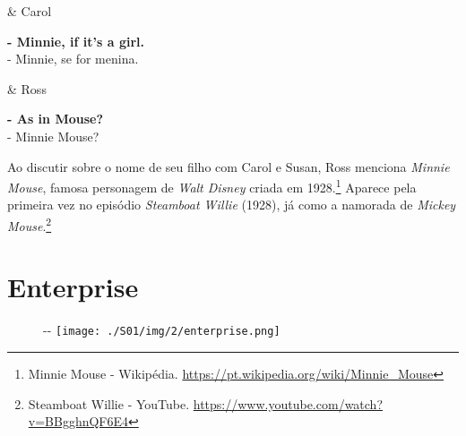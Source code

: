\begin{tcolorbox}[enhanced,center upper,
    drop fuzzy shadow southeast, boxrule=0.3pt,
    lower separated=false, breakable,
    colframe=black!30!dialogoBorder,colback=white]
\begin{minipage}[c]{0.16\linewidth}
   & \centering \scriptsize{Carol}
\end{minipage}
\hfill
\begin{minipage}[c]{0.8\linewidth}
  \textbf{- Minnie, if it's a girl.}\\
  - Minnie, se for menina.
\end{minipage}

\medskip
\begin{minipage}[c]{0.16\linewidth}
   & \centering \scriptsize{Ross}
\end{minipage}
\hfill
\begin{minipage}[c]{0.8\linewidth}
  \textbf{- As in Mouse?}\\
  - Minnie Mouse?
\end{minipage}
\end{tcolorbox}

Ao discutir sobre o nome de seu filho com Carol e Susan, Ross menciona
\emph{Minnie Mouse}, famosa personagem de \emph{Walt Disney} criada em
1928.\footnote{\sloppy Minnie Mouse - Wikipédia. \url{https://pt.wikipedia.org/wiki/Minnie_Mouse}}
Aparece pela primeira vez no episódio \emph{Steamboat Willie} (1928), já
como a namorada de \emph{Mickey Mouse}.\footnote{\sloppy Steamboat Willie - YouTube. \url{https://www.youtube.com/watch?v=BBgghnQF6E4}}

\hypertarget{enterprise}{%
\section{Enterprise}\label{enterprise}}

\begin{figure}[!ht]
  \begin{adjustwidth}{-\oddsidemargin-1in}{-\rightmargin}
    \centering
    \texttt{[image: ./S01/img/2/enterprise.png]}
  \end{adjustwidth}
\end{figure}

